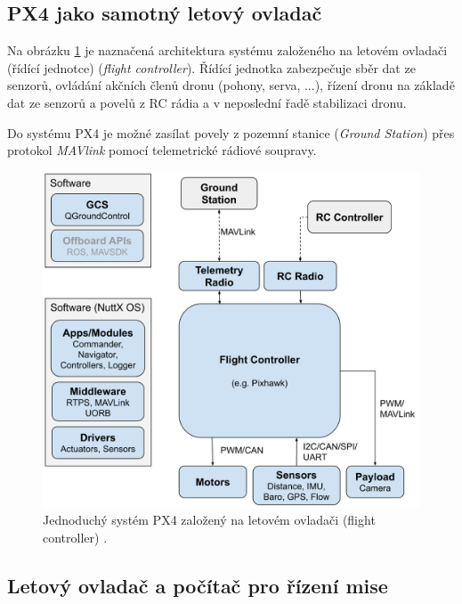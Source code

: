 \subsection{PX4 jako samotný letový ovladač}

Na obrázku \ref{fig:PX4_FC} je naznačená architektura systému založeného na letovém ovladači (řídící jednotce) (\textit{flight controller}). Řídící jednotka zabezpečuje sběr dat ze senzorů, ovládání akčních členů dronu (pohony, serva, ...), řízení dronu na základě dat ze senzorů a povelů z RC rádia a v neposlední řadě stabilizaci dronu.

Do systému PX4 je možné zasílat povely z pozemní stanice (\textit{Ground Station}) přes protokol \textit{MAVlink} pomocí telemetrické rádiové soupravy.

\begin{figure}[!ht]
    \begin{center}
        \includegraphics[scale=0.36]{obrazky/PX42}
    \end{center}
    \caption[Jednoduchý systém PX4 založený na letovém ovladači (flight controller)]{Jednoduchý systém PX4 založený na letovém ovladači (flight controller) \cite{PX4main2}.}
    \label{fig:PX4_FC}
\end{figure}

\subsection{Letový ovladač a počítač pro řízení mise}

